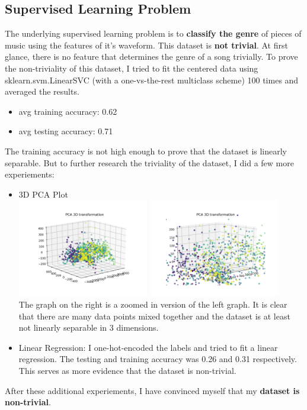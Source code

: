 \documentclass[12pt]{article}
\begin{document}
\subsection{Supervised Learning Problem}
The underlying supervised learning problem is to \textbf{classify the genre} of pieces of music using the features of it's waveform. This dataset is \textbf{not trivial}. At first glance, there is no feature that determines the genre of a song trivially. To prove the non-triviality of this dataset, I tried to fit the centered data using sklearn.svm.LinearSVC (with a one-vs-the-rest multiclass scheme) 100 times and averaged the results.
\begin{itemize}
    \item avg training accuracy: 0.62
    \item avg testing accuracy: 0.71
\end{itemize}
The training accuracy is not high enough to prove that the dataset is linearly separable. But to further research the triviality of the dataset, I did a few more experiements:
\begin{itemize}
    \item 3D PCA Plot
    \\ \includegraphics[width=0.45\textwidth]{pca0} \includegraphics[width=0.45\textwidth]{pca1}
    \\ The graph on the right is a zoomed in version of the left graph. It is clear that there are many data points mixed together and the dataset is at least not linearly separable in 3 dimensions.
    \item Linear Regression: I one-hot-encoded the labels and tried to fit a linear regression. The testing and training accuracy was 0.26 and 0.31 respectively. This serves as more evidence that the dataset is non-trivial.
\end{itemize}
After these additional experiements, I have convinced myself that my \textbf{dataset is non-trivial}.
\end{document}
